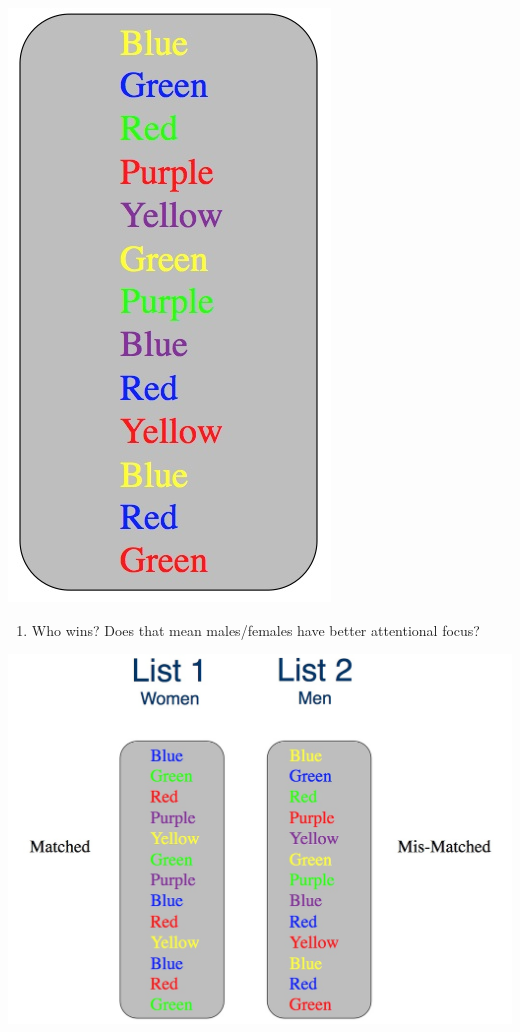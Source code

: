 \documentclass[11pt]{article}
\begin{document}
\includegraphics[width=.9\linewidth]{figures/list2.jpg}

\begin{enumerate}
\item Who wins?  Does that mean males/females have better attentional focus?
\end{enumerate}

\includegraphics[width=.9\linewidth]{figures/compare.jpg}
\end{document}
